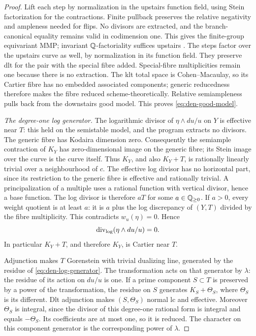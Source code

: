 \begin{proof}
Lift each step by normalization in the upstairs function field,
using Stein factorization for the contractions.  Finite pullback
preserves the relative negativity and ampleness needed for flips.
No divisors are extracted, and the branch-canonical equality remains
valid in codimension one.  This gives the finite-group equivariant
MMP; invariant $\mathbb Q$-factoriality suffices upstairs
\cite[Theorems~3.3.2 and~3.4.2]{Prokhorov2021}.  The steps factor
over the upstairs curve as well, by normalization in its function
field.  They preserve dlt for the pair with the special fibre added.
Special-fibre multiplicities remain one because there is no
extraction.  The klt total space is Cohen--Macaulay, so its Cartier
fibre has no embedded associated components; generic reducedness
therefore makes the fibre reduced scheme-theoretically.
Relative semiampleness pulls back from the
downstairs good model.  This proves \eqref{eq:den-good-model}.

\smallskip\noindent\textit{The degree-one log generator.}
The logarithmic divisor of $\eta\wedge du/u$ on $Y$ is effective
near $T$: this held on the semistable model, and the program extracts
no divisors.  The generic fibre has Kodaira dimension zero.
Consequently the semiample contraction of $K_Y$ has
zero-dimensional image on the generic fibre; its Stein image over
the curve is the curve itself.  Thus $K_Y$, and also $K_Y+T$, is
rationally linearly trivial over a neighbourhood of $c$.
The effective log divisor has no horizontal part, since its
restriction to the generic fibre is effective and rationally
trivial.  A principalization of a multiple uses a rational function
with vertical divisor, hence a base function.  The log divisor is
therefore $aT$ for some $a\in\mathbb Q_{\geq0}$.  If $a>0$, every
weight quotient is at least $a$: it is $a$ plus the log discrepancy
of $(Y,T)$ divided by the fibre multiplicity.  This contradicts
$w_u(\eta)=0$.  Hence
\begin{equation}\label{eq:den-log-generator}
 \operatorname{div}_{\log}(\eta\wedge du/u)=0.
\end{equation}
In particular $K_Y+T$, and therefore $K_Y$, is Cartier near $T$.

Adjunction makes $T$ Gorenstein with trivial dualizing line, generated
by the residue of \eqref{eq:den-log-generator}.  The transformation
acts on that generator by $\lambda$: the residue of its action on
$du/u$ is one.  If a prime component $S\subset T$ is preserved by
a power of the transformation, the residue on $S$ generates
$K_S+\Theta_S$, where $\Theta_S$ is its different.  Dlt
adjunction makes $(S,\Theta_S)$ normal lc and effective.  Moreover
$\Theta_S$ is integral, since the divisor of this degree-one
rational form is integral and equals $-\Theta_S$.  Its coefficients
are at most one, so it is reduced.  The character on this component
generator is the corresponding power of $\lambda$.


\end{proof}
